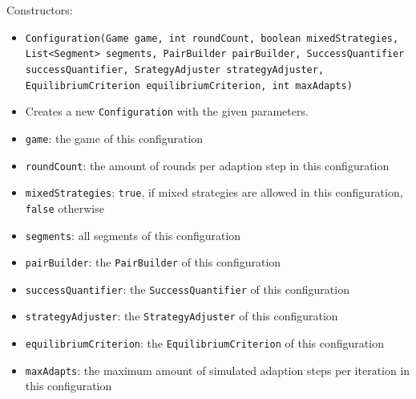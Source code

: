 \documentclass[parskip=full,11pt]{scrartcl}
\begin{document}
Constructors:
\begin{itemize}\itemsep -10pt
\item \texttt{Configuration(Game game, int roundCount, boolean mixedStrategies, List<Segment> segments, PairBuilder pairBuilder, SuccessQuantifier successQuantifier, SrategyAdjuster strategyAdjuster, EquilibriumCriterion equilibriumCriterion, int maxAdapts)}
\item[] Creates a new \texttt{Configuration} with the given parameters.
\item[] \texttt{game}: the game of this configuration
\item[] \texttt{roundCount}: the amount of rounds per adaption step in this configuration
\item[] \texttt{mixedStrategies}: \texttt{true}, if mixed strategies are allowed in this configuration, \texttt{false} otherwise
\item[] \texttt{segments}: all segments of this configuration
\item[] \texttt{pairBuilder}: the \texttt{PairBuilder} of this configuration
\item[] \texttt{successQuantifier}: the \texttt{SuccessQuantifier} of this configuration
\item[] \texttt{strategyAdjuster}: the \texttt{StrategyAdjuster} of this configuration
\item[] \texttt{equilibriumCriterion}: the \texttt{EquilibriumCriterion} of this configuration
\item[] \texttt{maxAdapts}: the maximum amount of simulated adaption steps per iteration in this configuration
\end{itemize}
\end{document}
